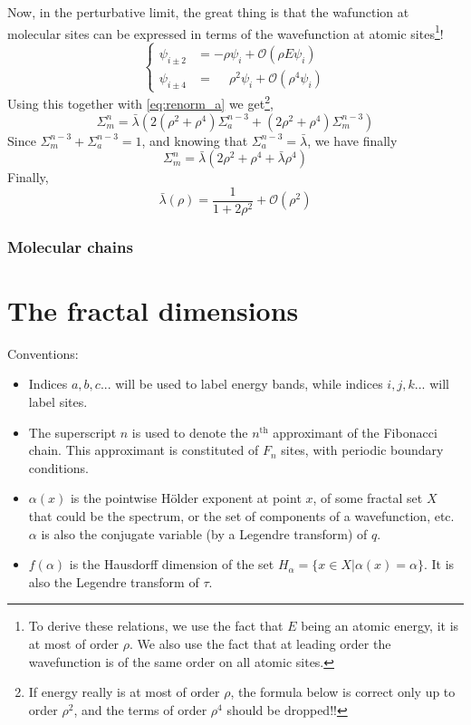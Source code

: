 \documentclass[11pt]{article}
\begin{document}
Now, in the perturbative limit, the great thing is that the wafunction at molecular sites can be expressed in terms of the wavefunction at atomic sites\footnote{To derive these relations, we use the fact that $E$ being an atomic energy, it is at most of order $\rho$. We also use the fact that at leading order the wavefunction is of the same order on all atomic sites.}! 
\begin{equation}
	\begin{cases}
	\psi_{i\pm2} &= - \rho \psi_i + \mathcal{O}(\rho E \psi_i) \\
	\psi_{i\pm4} &= \phantom{-}\rho^2 \psi_i  + \mathcal{O}(\rho^4 \psi_i)
	\end{cases}
\end{equation}
Using this together with \eqref{eq:renorm_a} we get\footnote{If energy really is at most of order $\rho$, the formula below is correct only up to order $\rho^2$, and the terms of order $\rho^4$ should be dropped!!},
\begin{equation}
	\Sigma_m^n = \bar \lambda \left( 2(\rho^2 + \rho^4) \Sigma_a^{n-3} + (2 \rho^2 + \rho^4) \Sigma_m^{n-3} \right)
\end{equation}
Since $\Sigma_m^{n-3} + \Sigma_a^{n-3} = 1$, and knowing that $\Sigma_a^{n-3} = \bar \lambda$, we have finally
\begin{equation}
\boxed{
	\Sigma_m^n = \bar \lambda \left( 2 \rho^2 + \rho^4 + \bar \lambda \rho^4 \right)
}
\end{equation}
Finally,
\begin{equation}
\boxed{
	\bar \lambda(\rho) = \frac{1}{1+2\rho^2} +\mathcal{O}(\rho^2)
}
\end{equation}
\subsubsection{Molecular chains}

\section{The fractal dimensions}
Conventions: 
\begin{itemize}
	\item Indices $a,b,c...$ will be used to label energy bands, while indices $i,j,k...$ will label sites.
	\item The superscript $n$ is used to denote the $n^\text{th}$ approximant of the Fibonacci chain. This approximant is constituted of $F_n$ sites, with periodic boundary conditions.
	\item $\alpha(x)$ is the pointwise Hölder exponent at point $x$, of some fractal set $X$ that could be the spectrum, or the set of components of a wavefunction, etc. $\alpha$ is also the conjugate variable (by a Legendre transform) of $q$. 
	\item $f(\alpha)$ is the Hausdorff dimension of the set $H_\alpha = \{ x \in X | \alpha(x) = \alpha \}$. It is also the Legendre transform of $\tau$.
\end{itemize}
\end{document}
